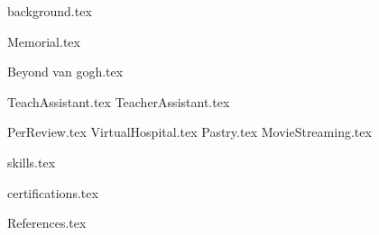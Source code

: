 \documentclass[11pt]{article}
\begin{document}
{background.tex}


{Memorial.tex}






{Beyond van gogh.tex}

{TeachAssistant.tex}
{TeacherAssistant.tex}


{PerReview.tex}
{VirtualHospital.tex}
{Pastry.tex}
{MovieStreaming.tex}




{skills.tex}

{certifications.tex}


{References.tex}
\end{document}
